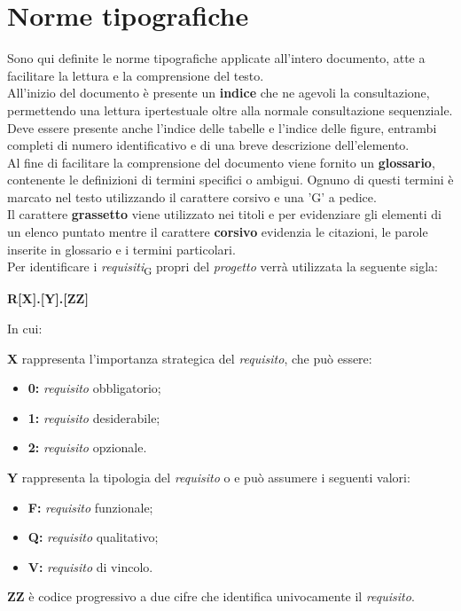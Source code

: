 \hypertarget{header-n15}{%
	\section{Norme tipografiche}\label{header-n15}}

Sono qui definite le norme tipografiche applicate all'intero documento,
atte a facilitare la lettura e la comprensione del testo.\\

All'inizio del documento è presente un \textbf{indice} che ne agevoli la
consultazione, permettendo una lettura ipertestuale oltre alla normale
consultazione sequenziale. Deve essere presente anche l'indice delle
tabelle e l'indice delle figure, entrambi completi di numero
identificativo e di una breve descrizione dell'elemento.\\

Al fine di facilitare la comprensione del documento viene fornito un
\textbf{glossario}, contenente le definizioni di termini specifici o
ambigui. Ognuno di questi termini è marcato nel testo utilizzando il
carattere corsivo e una 'G' a pedice.\\

Il carattere \textbf{grassetto} viene utilizzato nei titoli e per
evidenziare gli elementi di un elenco puntato mentre il carattere
\textbf{corsivo} evidenzia le citazioni, le parole inserite in glossario
e i termini particolari.\\

Per identificare i \emph{requisiti}\textsubscript{G} propri del
\emph{progetto} verrà utilizzata la seguente sigla:

\centerline{\textbf{R{[}X{]}.{[}Y{]}.{[}ZZ{]}}}
In cui:

\textbf{X} rappresenta l'importanza strategica del \emph{requisito}, che
può essere:

\begin{itemize}
	\item
	\textbf{0:} \emph{requisito} obbligatorio;
	\item
	\textbf{1:} \emph{requisito} desiderabile;
	\item
	\textbf{2:} \emph{requisito} opzionale. 
\end{itemize}

\textbf{Y} rappresenta la tipologia del \emph{requisito} o e può
assumere i seguenti valori:

\begin{itemize}
	\item
	\textbf{F:} \emph{requisito} funzionale;
	\item
	\textbf{Q:} \emph{requisito} qualitativo; 
	\item
	\textbf{V:} \emph{requisito} di vincolo. 
\end{itemize}

\textbf{ZZ} è codice progressivo a due cifre che identifica univocamente
il \emph{requisito}.